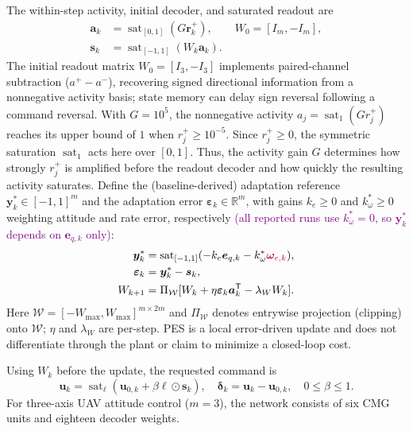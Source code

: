 \documentclass[letterpaper, 10 pt, conference]{ieeeconf}
\newcommand{\R}{\mathbb R}
\newcommand{\T}{^{\mathsf T}}
\newcommand{\sat}{\operatorname{sat}}
\begin{document}
The within-step activity, initial decoder, and saturated readout are
\begin{equation}
 \begin{aligned}
 \bm a_k&=\sat_{[0,1]}(G\bm r_k^+),\qquad W_0=[I_m,-I_m],\\
 \bm s_k&=\sat_{[-1,1]}(W_k\bm a_k).
 \end{aligned}
 \label{eq:readout}
\end{equation}
The initial readout matrix $W_0=[I_3,-I_3]$ implements paired-channel
subtraction ($a^+-a^-$), recovering signed directional information from
a nonnegative activity basis; state memory can delay sign reversal
following a command reversal. With $G=10^5$, the nonnegative activity
$a_j=\sat_{1}(G r_j^+)$ reaches its upper bound of $1$
when $r_j^+\ge10^{-5}$. Since $r_j^+\ge0$, the symmetric
saturation $\sat_{1}$ acts here over $[0,1]$. Thus, the activity
gain $G$ determines how strongly $r_j^+$ is amplified before the
readout decoder and how quickly the resulting activity saturates. Define the (baseline-derived) adaptation reference $\bm y_k^*\in[-1,1]^m$ and the adaptation error $\bm\varepsilon_k\in\R^m$, with gains $k_e\ge0$ and $k_\omega^*\ge0$ weighting attitude and rate error, respectively \textcolor{purple}{(all reported runs use $k_\omega^*=0$, so $\bm y_k^*$ depends on $\bm e_{q,k}$ only)}:
\begin{align}
 \bm y_k^*&=\sat_{[-1,1]}(-k_e\bm e_{q,k}-k_\omega^*\textcolor{purple}{\bm\omega_{e,k}}),\\
 \bm\varepsilon_k&=\bm y_k^*-\bm s_k,\\
 W_{k+1}&=\Pi_{\mathcal W}
       [W_k+\eta\bm\varepsilon_k\bm a_k\T-\lambda_W W_k].
 \label{eq:pes}
\end{align}
Here $\mathcal W=[-W_{\max},W_{\max}]^{m\times2m}$ and $\Pi_{\mathcal W}$ denotes entrywise projection (clipping) onto $\mathcal W$; $\eta$ and $\lambda_W$ are per-step. PES is a local error-driven update and does not differentiate through the plant or claim to minimize a closed-loop cost.

Using $W_k$ before the update, the requested command is
\begin{equation}
 \bm u_k=\sat_{\bm\ell}(\bm u_{0,k}+\beta\bm\ell\odot\bm s_k),\quad
 \bm\delta_k=\bm u_k-\bm u_{0,k},\quad 0\le\beta\le1.
 \label{eq:residual}
\end{equation}
For three-axis UAV attitude control ($m=3$), the network consists of
six CMG units and eighteen decoder weights.
\end{document}
